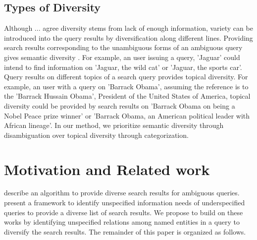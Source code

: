 \documentclass[11pt]{article}
\begin{document}
\subsection{Types of Diversity}
Although ... agree diversity stems from lack of enough information, variety 
can be introduced into the query results by diversification along different 
lines. Providing search results corresponding to the unambiguous forms of an 
ambiguous query gives semantic diversity \cite{gollapudi2009axiomatic}. For 
example, an user issuing a query, 'Jaguar' could intend to find information on 
'Jaguar, the wild cat' or 'Jaguar, the sports car'. Query results on different 
topics of a search query provides topical diversity. For example, an user with 
a query on 'Barrack Obama', assuming the reference is to the 'Barrack Hussain 
Obama', President of the United States of America, topical diversity could be 
provided by search results on 'Barrack Obama on being a Nobel Peace prize winner' 
or 'Barrack Obama, an American political leader with African lineage'. In our 
method, we prioritize semantic diversity through disambiguation over topical 
diversity through categorization.

 
\cite{santos2010explicit}
\cite{santos2010selectively}
\cite{bhatia2012analysis}

\section{Motivation and Related work}

\cite{agrawal2009diversifying} describe an algorithm to provide diverse search results for
ambiguous queries. \cite{santos2010exploiting} present a framework to identify unspecified
information needs of underspecified queries to provide a diverse list of search results. We
propose to build on these works by identifying unspecified relations among named entities
in a query to diversify the search results.
The remainder of this paper is organized as follows.
\end{document}
